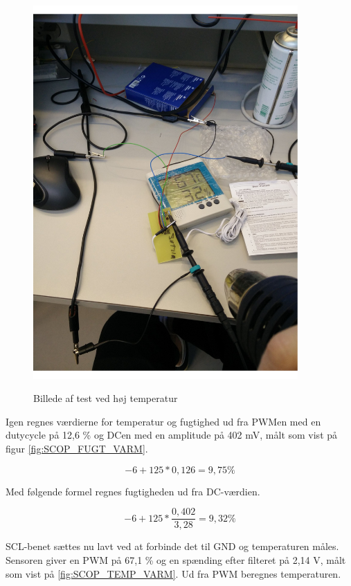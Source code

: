 \begin{figure}[H]
\centering
{\includegraphics[width=0.90\textwidth]{filer/modultest/Billeder/test_VARM}}
\caption{Billede af test ved høj temperatur}
\label{lab:TEST_VARM}
\end{figure}

Igen regnes værdierne for temperatur og fugtighed ud fra PWMen med en dutycycle på 12,6 \% og DCen med en amplitude på 402 mV, målt som vist på figur \ref{fig:SCOP_FUGT_VARM}.

\begin{equation}
-6+125*0,126= 9,75\%
\end{equation}

Med følgende formel regnes fugtigheden ud fra DC-værdien.

\begin{equation}
-6+125*\frac{0,402}{3,28}= 9,32\%
\end{equation}

SCL-benet sættes nu lavt ved at forbinde det til GND og temperaturen måles. Sensoren giver en PWM på 67,1 \% og en spænding efter filteret på 2,14 V, målt som vist på \ref{fig:SCOP_TEMP_VARM}. 
Ud fra PWM beregnes temperaturen.


